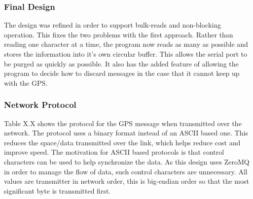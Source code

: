 \subsubsection{Final Design}

The design was refined in order to support bulk-reads and non-blocking operation. This fixes the two problems with the first approach. Rather than reading one character at a time, the program now reads as many as possible and stores the information into it’s own circular buffer. This allows the serial port to be purged as quickly as possible. It also has the added feature of allowing the program to decide how to discard messages in the case that it cannot keep up with the GPS.

\subsubsection{Network Protocol}

Table X.X shows the protocol for the GPS message when transmitted over the network. The protocol uses a binary format instead of an ASCII based one. This reduces the space/data transmitted over the link, which helps reduce cost and improve speed. The motivation for ASCII based protocols is that control characters can be used to help synchronize the data. As this design uses ZeroMQ in order to manage the flow of data, such control characters are unnecessary. All values are transmitter in network order, this is big-endian order so that the most significant byte is transmitted first.





